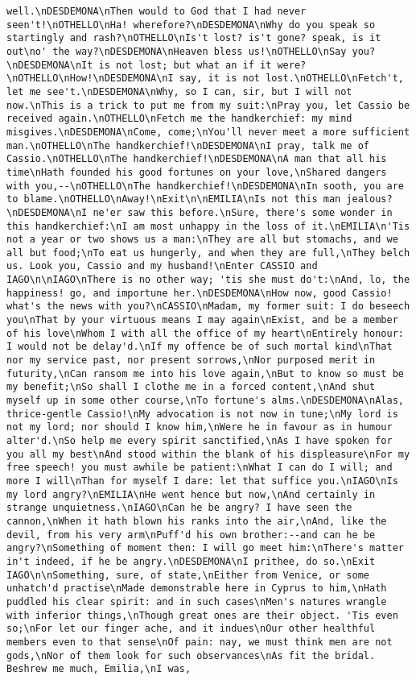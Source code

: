 \begin{verbatim}
well.\nDESDEMONA\nThen would to God that I had never seen't!\nOTHELLO\nHa! wherefore?\nDESDEMONA\nWhy do you speak so startingly and rash?\nOTHELLO\nIs't lost? is't gone? speak, is it out\no' the way?\nDESDEMONA\nHeaven bless us!\nOTHELLO\nSay you?\nDESDEMONA\nIt is not lost; but what an if it were?\nOTHELLO\nHow!\nDESDEMONA\nI say, it is not lost.\nOTHELLO\nFetch't, let me see't.\nDESDEMONA\nWhy, so I can, sir, but I will not now.\nThis is a trick to put me from my suit:\nPray you, let Cassio be received again.\nOTHELLO\nFetch me the handkerchief: my mind misgives.\nDESDEMONA\nCome, come;\nYou'll never meet a more sufficient man.\nOTHELLO\nThe handkerchief!\nDESDEMONA\nI pray, talk me of Cassio.\nOTHELLO\nThe handkerchief!\nDESDEMONA\nA man that all his time\nHath founded his good fortunes on your love,\nShared dangers with you,--\nOTHELLO\nThe handkerchief!\nDESDEMONA\nIn sooth, you are to blame.\nOTHELLO\nAway!\nExit\n\nEMILIA\nIs not this man jealous?\nDESDEMONA\nI ne'er saw this before.\nSure, there's some wonder in this handkerchief:\nI am most unhappy in the loss of it.\nEMILIA\n'Tis not a year or two shows us a man:\nThey are all but stomachs, and we all but food;\nTo eat us hungerly, and when they are full,\nThey belch us. Look you, Cassio and my husband!\nEnter CASSIO and IAGO\n\nIAGO\nThere is no other way; 'tis she must do't:\nAnd, lo, the happiness! go, and importune her.\nDESDEMONA\nHow now, good Cassio! what's the news with you?\nCASSIO\nMadam, my former suit: I do beseech you\nThat by your virtuous means I may again\nExist, and be a member of his love\nWhom I with all the office of my heart\nEntirely honour: I would not be delay'd.\nIf my offence be of such mortal kind\nThat nor my service past, nor present sorrows,\nNor purposed merit in futurity,\nCan ransom me into his love again,\nBut to know so must be my benefit;\nSo shall I clothe me in a forced content,\nAnd shut myself up in some other course,\nTo fortune's alms.\nDESDEMONA\nAlas, thrice-gentle Cassio!\nMy advocation is not now in tune;\nMy lord is not my lord; nor should I know him,\nWere he in favour as in humour alter'd.\nSo help me every spirit sanctified,\nAs I have spoken for you all my best\nAnd stood within the blank of his displeasure\nFor my free speech! you must awhile be patient:\nWhat I can do I will; and more I will\nThan for myself I dare: let that suffice you.\nIAGO\nIs my lord angry?\nEMILIA\nHe went hence but now,\nAnd certainly in strange unquietness.\nIAGO\nCan he be angry? I have seen the cannon,\nWhen it hath blown his ranks into the air,\nAnd, like the devil, from his very arm\nPuff'd his own brother:--and can he be angry?\nSomething of moment then: I will go meet him:\nThere's matter in't indeed, if he be angry.\nDESDEMONA\nI prithee, do so.\nExit IAGO\n\nSomething, sure, of state,\nEither from Venice, or some unhatch'd practise\nMade demonstrable here in Cyprus to him,\nHath puddled his clear spirit: and in such cases\nMen's natures wrangle with inferior things,\nThough great ones are their object. 'Tis even so;\nFor let our finger ache, and it indues\nOur other healthful members even to that sense\nOf pain: nay, we must think men are not gods,\nNor of them look for such observances\nAs fit the bridal. Beshrew me much, Emilia,\nI was, 
\end{verbatim}
